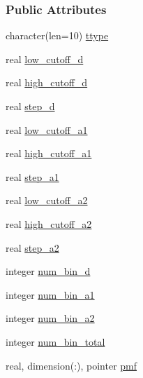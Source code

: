 \subsubsection*{Public Attributes}
\begin{DoxyCompactItemize}
\item 
character(len=10) \hyperlink{structcalc__xscore_1_1thb__def_a254c4f2eaafd426d56c90c69ad2c4147}{ttype}
\item 
real \hyperlink{structcalc__xscore_1_1thb__def_aa1f2e79bf3706a2baa8b2ea9154fc6db}{low\-\_\-cutoff\-\_\-d}
\item 
real \hyperlink{structcalc__xscore_1_1thb__def_ad99aabc341870fadb205bdea588b9ac0}{high\-\_\-cutoff\-\_\-d}
\item 
real \hyperlink{structcalc__xscore_1_1thb__def_a41a9940c8cd2829e19aa6d0afcad8812}{step\-\_\-d}
\item 
real \hyperlink{structcalc__xscore_1_1thb__def_acba6aacf17b79ce2ad0025e50cc22be2}{low\-\_\-cutoff\-\_\-a1}
\item 
real \hyperlink{structcalc__xscore_1_1thb__def_ad7256f0f60e196b2617272a587bc7656}{high\-\_\-cutoff\-\_\-a1}
\item 
real \hyperlink{structcalc__xscore_1_1thb__def_aa39b4597b36f86d4f09ea556b12d2885}{step\-\_\-a1}
\item 
real \hyperlink{structcalc__xscore_1_1thb__def_a89d723cb20d63b66318b21d8ac6a362b}{low\-\_\-cutoff\-\_\-a2}
\item 
real \hyperlink{structcalc__xscore_1_1thb__def_a32990b8ca6bf48022d6b92afd035a4c0}{high\-\_\-cutoff\-\_\-a2}
\item 
real \hyperlink{structcalc__xscore_1_1thb__def_aba1804dba817ca4c0614e7387e6c8464}{step\-\_\-a2}
\item 
integer \hyperlink{structcalc__xscore_1_1thb__def_ab89eb40cf6463f9a3f73d53941021b0a}{num\-\_\-bin\-\_\-d}
\item 
integer \hyperlink{structcalc__xscore_1_1thb__def_a3a7bdbdcac9fd8850cd7ad6693820356}{num\-\_\-bin\-\_\-a1}
\item 
integer \hyperlink{structcalc__xscore_1_1thb__def_a6177343713c10a4be205ac6909a97171}{num\-\_\-bin\-\_\-a2}
\item 
integer \hyperlink{structcalc__xscore_1_1thb__def_ac25e97b1218aaf44a54e4a9014893e59}{num\-\_\-bin\-\_\-total}
\item 
real, dimension(\-:), pointer \hyperlink{structcalc__xscore_1_1thb__def_af52e0808cb910b34d054894c26308569}{pmf}
\end{DoxyCompactItemize}


